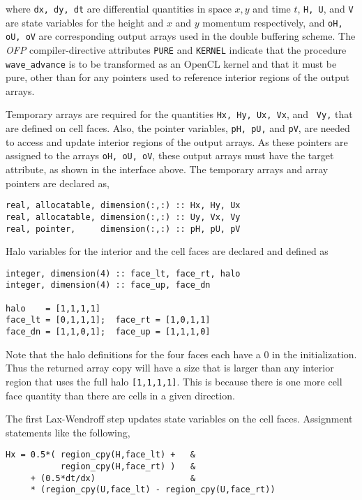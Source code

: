 \noindent
where {\tt dx, dy, dt} are differential quantities in space $x, y$ and time $t$,
{\tt H, U}, and {\tt V} are state variables for the height and $x$ and $y$
momentum respectively, and {\tt oH, oU, oV} are corresponding output arrays used
in the double buffering scheme.  The \emph{OFP} compiler-directive attributes
{\tt PURE} and {\tt KERNEL} indicate that the procedure {\tt wave\_advance} is
to be transformed as an OpenCL kernel and that it must be pure, other than for any
pointers used to reference interior regions of the output arrays.

Temporary arrays are required for the quantities {\tt Hx, Hy, Ux, Vx}, and {\tt
  Vy,} that are defined on cell faces.  Also, the pointer variables, {\tt pH,
  pU,} and {\tt pV}, are needed to access and update interior regions of the
output arrays.  As these pointers are assigned to the arrays {\tt oH, oU, oV},
these output arrays must have the target attribute, as shown in the interface
above.  The temporary arrays and array pointers are declared as,

{\small
\begin{verbatim}
real, allocatable, dimension(:,:) :: Hx, Hy, Ux
real, allocatable, dimension(:,:) :: Uy, Vx, Vy
real, pointer,     dimension(:,:) :: pH, pU, pV
\end{verbatim}
}

Halo variables for the interior and the cell faces are declared and defined as

{\small
\begin{verbatim}
integer, dimension(4) :: face_lt, face_rt, halo
integer, dimension(4) :: face_up, face_dn

halo    = [1,1,1,1]
face_lt = [0,1,1,1];  face_rt = [1,0,1,1]
face_dn = [1,1,0,1];  face_up = [1,1,1,0]
\end{verbatim}
}

\noindent
Note that the halo definitions for the four faces each have a 0 in the
initialization. Thus the returned array copy will have a size that is larger
than any interior region that uses the full halo {\tt [1,1,1,1]}.  This is
because there is one more cell face quantity than there are cells in a given
direction.

The first Lax-Wendroff step updates state variables on the cell faces.  Assignment
statements like the following,

{\small
\begin{verbatim}
Hx = 0.5*( region_cpy(H,face_lt) +   &
           region_cpy(H,face_rt) )   &
     + (0.5*dt/dx)                   &
     * (region_cpy(U,face_lt) - region_cpy(U,face_rt))
\end{verbatim}
}

